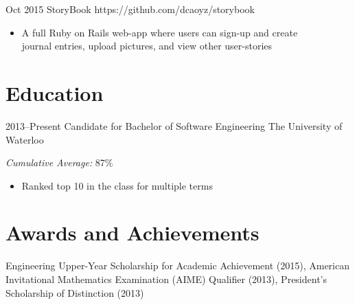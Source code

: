 \documentclass[print]{friggeri-cv} %
\begin{document}
\begin{projlist}
\proj
{Oct 2015}
{StoryBook}
{https://github.com/dcaoyz/storybook}
{
\begin{itemize}
\item A full Ruby on Rails web-app where users can sign-up and create \\ journal entries, upload pictures, and view other user-stories
\end{itemize}}
\end{projlist}


\section{Education}

\begin{entrylist}
\entry
{2013--Present}
{{\normalfont Candidate for} Bachelor of Software Engineering}
{The University of Waterloo}
{\emph{Cumulative Average: }{87\%}
\begin{itemize}
\item Ranked top 10 in the class for multiple terms
\end{itemize}
}
\end{entrylist}


\section{Awards and Achievements}

Engineering Upper-Year Scholarship for Academic Achievement (2015), American Invitational Mathematics Examination (AIME) Qualifier (2013), President's Scholarship of Distinction (2013)
\end{document}
